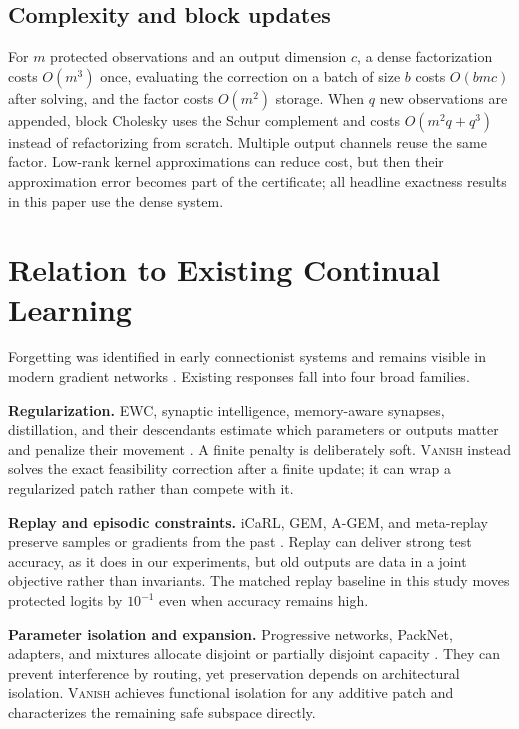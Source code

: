 \documentclass{vanish_ieee}
\theoremstyle{definition}
\newcommand{\VANISH}{\textsc{Vanish}}
\begin{document}
\subsection{Complexity and block updates}

For $m$ protected observations and an output dimension $c$, a dense factorization costs $O(m^3)$ once, evaluating the correction on a batch of size $b$ costs $O(bmc)$ after solving, and the factor costs $O(m^2)$ storage.  When $q$ new observations are appended, block Cholesky uses the Schur complement and costs $O(m^2q+q^3)$ instead of refactorizing from scratch.  Multiple output channels reuse the same factor.  Low-rank kernel approximations can reduce cost, but then their approximation error becomes part of the certificate; all headline exactness results in this paper use the dense system.

\section{Relation to Existing Continual Learning}

Forgetting was identified in early connectionist systems \cite{mccloskey1989catastrophic,french1999catastrophic} and remains visible in modern gradient networks \cite{goodfellow2014empirical}.  Existing responses fall into four broad families.

\textbf{Regularization.}  EWC, synaptic intelligence, memory-aware synapses, distillation, and their descendants estimate which parameters or outputs matter and penalize their movement \cite{kirkpatrick2017overcoming,zenke2017continual,aljundi2018mas,li2017learning,liu2026ewc}.  A finite penalty is deliberately soft.  \VANISH{} instead solves the exact feasibility correction after a finite update; it can wrap a regularized patch rather than compete with it.

\textbf{Replay and episodic constraints.}  iCaRL, GEM, A-GEM, and meta-replay preserve samples or gradients from the past \cite{rebuffi2017icarl,lopezpaz2017gem,chaudhry2019agem,riemer2019mer}.  Replay can deliver strong test accuracy, as it does in our experiments, but old outputs are data in a joint objective rather than invariants.  The matched replay baseline in this study moves protected logits by $10^{-1}$ even when accuracy remains high.

\textbf{Parameter isolation and expansion.}  Progressive networks, PackNet, adapters, and mixtures allocate disjoint or partially disjoint capacity \cite{rusu2016progressive,mallya2018packnet,schwarz2018progress,wang2025selfexpansion}.  They can prevent interference by routing, yet preservation depends on architectural isolation.  \VANISH{} achieves functional isolation for any additive patch and characterizes the remaining safe subspace directly.
\end{document}
